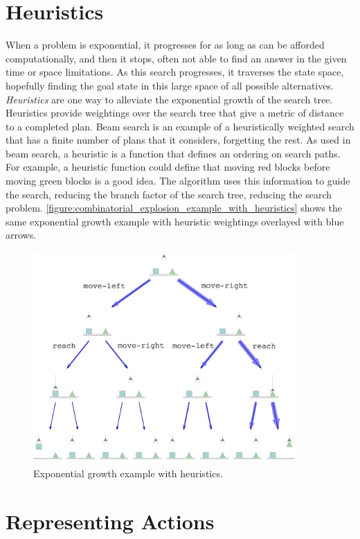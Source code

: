 \section{Heuristics}

When a problem is exponential, it progresses for as long as can be
afforded computationally, and then it stops, often not able to find an
answer in the given time or space limitations.  As this search
progresses, it traverses the state space, hopefully finding the goal
state in this large space of all possible alternatives.
\emph{Heuristics} are one way to alleviate the exponential growth of
the search tree.  Heuristics provide weightings over the search tree
that give a metric of distance to a completed plan.  Beam search is an
example of a heuristically weighted search that has a finite number of
plans that it considers, forgetting the rest.  As used in beam search,
a heuristic is a function that defines an ordering on search paths.
For example, a heuristic function could define that moving red blocks
before moving green blocks is a good idea.  The algorithm uses this
information to guide the search, reducing the branch factor of the
search tree, reducing the search problem.
\autoref{figure:combinatorial_explosion_example_with_heuristics} shows
the same exponential growth example with heuristic weightings
overlayed with blue arrows.
\begin{figure}
\center
\includegraphics[width=10cm]{gfx/combinatorial_explosion_example_with_heuristics}
\caption{Exponential growth example with heuristics.}
\label{figure:combinatorial_explosion_example_with_heuristics}
\end{figure}

\section{Representing Actions}

